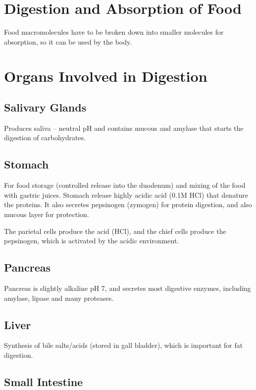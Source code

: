 \section{Digestion and Absorption of Food}

Food macromolecules have to be broken down into smaller molecules for absorption, so it can be used by the body.

\section{Organs Involved in Digestion}

\subsection{Salivary Glands}

Produces saliva -- neutral pH and contains mucous and amylase that starts the digestion of carbohydrates.

\subsection{Stomach}

For food storage (controlled release into the duodenum) and mixing of the food with gastric juices.
Stomach release highly acidic acid (0.1M HCl) that denature the proteins.
It also secretes pepsinogen (zymogen) for protein digestion, and also mucous layer for protection.

The parietal cells produce the acid (HCl), and the chief cells produce the pepsinogen, which is activated by the acidic environment.

\subsection{Pancreas}

Pancreas is slightly alkaline pH 7, and secretes most digestive enzymes, including amylase, lipase and many proteases.

\subsection{Liver}

Synthesis of bile salts/acids (stored in gall bladder), which is important for fat digestion.

\subsection{Small Intestine}

